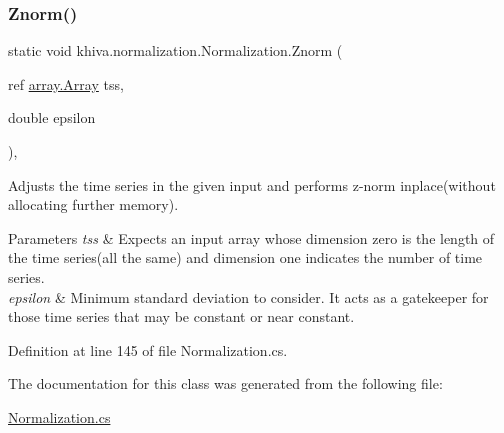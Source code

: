 \subsubsection{\texorpdfstring{Znorm()}{Znorm()}\hspace{0.1cm}{\footnotesize\ttfamily [2/2]}}
{\footnotesize\ttfamily static void khiva.\+normalization.\+Normalization.\+Znorm (\begin{DoxyParamCaption}\item[{ref \mbox{\hyperlink{classkhiva_1_1array_1_1_array}{array.\+Array}}}]{tss,  }\item[{double}]{epsilon }\end{DoxyParamCaption})\hspace{0.3cm}{\ttfamily [inline]}, {\ttfamily [static]}}



Adjusts the time series in the given input and performs z-\/norm inplace(without allocating further memory). 


\begin{DoxyParams}{Parameters}
{\em tss} & Expects an input array whose dimension zero is the length of the time series(all the same) and dimension one indicates the number of time series.\\
\hline
{\em epsilon} & Minimum standard deviation to consider. It acts as a gatekeeper for those time series that may be constant or near constant.\\
\hline
\end{DoxyParams}


Definition at line 145 of file Normalization.\+cs.



The documentation for this class was generated from the following file\+:\begin{DoxyCompactItemize}
\item 
\mbox{\hyperlink{_normalization_8cs}{Normalization.\+cs}}\end{DoxyCompactItemize}
